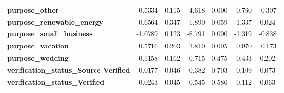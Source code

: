 \begin{center}
\begin{tabular}{lcccccc}
\textbf{purpose\_other}                        &      -0.5334  &        0.115     &    -4.618  &         0.000        &       -0.760    &       -0.307     \\
\textbf{purpose\_renewable\_energy}            &      -0.6564  &        0.347     &    -1.890  &         0.059        &       -1.337    &        0.024     \\
\textbf{purpose\_small\_business}              &      -1.0789  &        0.123     &    -8.791  &         0.000        &       -1.319    &       -0.838     \\
\textbf{purpose\_vacation}                     &      -0.5716  &        0.203     &    -2.810  &         0.005        &       -0.970    &       -0.173     \\
\textbf{purpose\_wedding}                      &      -0.1158  &        0.162     &    -0.715  &         0.475        &       -0.433    &        0.202     \\
\textbf{verification\_status\_Source Verified} &      -0.0177  &        0.046     &    -0.382  &         0.703        &       -0.109    &        0.073     \\
\textbf{verification\_status\_Verified}        &      -0.0243  &        0.045     &    -0.545  &         0.586        &       -0.112    &        0.063     \\
\bottomrule
\end{tabular}
\end{center}